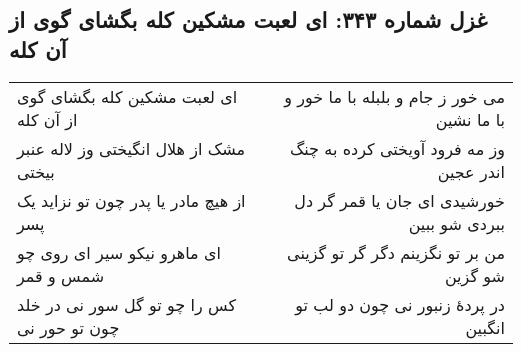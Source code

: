 \begin{center}
\section*{غزل شماره ۳۴۳: ای لعبت مشکین کله بگشای گوی از آن کله}
\label{sec:343}
\begin{longtable}{l p{0.5cm} r}
ای لعبت مشکین کله بگشای گوی از آن کله
&&
می خور ز جام و بلبله با ما خور و با ما نشین
\\
مشک از هلال انگیختی وز لاله عنبر بیختی
&&
وز مه فرود آویختی کرده به چنگ اندر عجین
\\
از هیچ مادر یا پدر چون تو نزاید یک پسر
&&
خورشیدی ای جان یا قمر گر دل ببردی شو ببین
\\
ای ماهرو نیکو سیر ای روی چو شمس و قمر
&&
من بر تو نگزینم دگر گر تو گزینی شو گزین
\\
کس را چو تو گل سور نی در خلد چون تو حور نی
&&
در پردهٔ زنبور نی چون دو لب تو انگبین
\\
\end{longtable}
\end{center}
